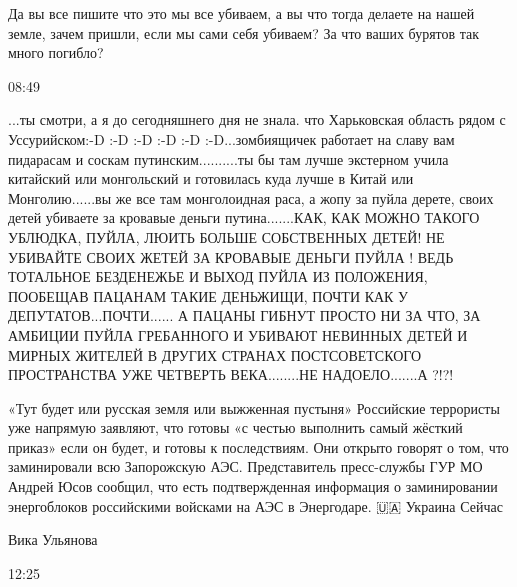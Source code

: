 {%

Да вы все пишите что это мы все убиваем, а вы что тогда делаете на нашей земле,
зачем пришли, если мы сами себя убиваем? За что ваших бурятов так много
погибло?

08:49

...ты смотри, а я до сегодняшнего дня не знала. что Харьковская область рядом с
Уссурийском:-D :-D :-D :-D :-D :-D...зомбиящичек работает на славу вам
пидарасам и соскам путинским..........ты бы там лучше экстерном учила китайский
или монгольский и готовилась куда лучше в Китай или Монголию......вы же все там
монголоидная раса, а жопу за пуйла дерете, своих детей убиваете за кровавые
деньги путина.......КАК, КАК МОЖНО ТАКОГО УБЛЮДКА, ПУЙЛА, ЛЮИТЬ БОЛЬШЕ
СОБСТВЕННЫХ ДЕТЕЙ! НЕ УБИВАЙТЕ СВОИХ ЖЕТЕЙ ЗА КРОВАВЫЕ ДЕНЬГИ ПУЙЛА ! ВЕДЬ
ТОТАЛЬНОЕ БЕЗДЕНЕЖЬЕ И ВЫХОД ПУЙЛА ИЗ ПОЛОЖЕНИЯ, ПООБЕЩАВ ПАЦАНАМ ТАКИЕ
ДЕНЬЖИЩИ, ПОЧТИ КАК У ДЕПУТАТОВ...ПОЧТИ...... А ПАЦАНЫ ГИБНУТ ПРОСТО НИ ЗА ЧТО,
ЗА АМБИЦИИ ПУЙЛА ГРЕБАННОГО И УБИВАЮТ НЕВИННЫХ ДЕТЕЙ И МИРНЫХ ЖИТЕЛЕЙ В ДРУГИХ
СТРАНАХ ПОСТСОВЕТСКОГО ПРОСТРАНСТВА УЖЕ ЧЕТВЕРТЬ ВЕКА........НЕ НАДОЕЛО.......А
?!?!


«Тут будет или русская земля или выжженная пустыня»
Российские террористы уже напрямую заявляют, что готовы «с честью выполнить самый жёсткий приказ» если он будет, и готовы к последствиям.
Они открыто говорят о том, что заминировали всю Запорожскую АЭС.
Представитель пресс-службы ГУР МО Андрей Юсов сообщил, что есть подтвержденная информация о заминировании энергоблоков российскими войсками на АЭС в Энергодаре.
🇺🇦 Украина Сейчас

Вика Ульянова

12:25

}
